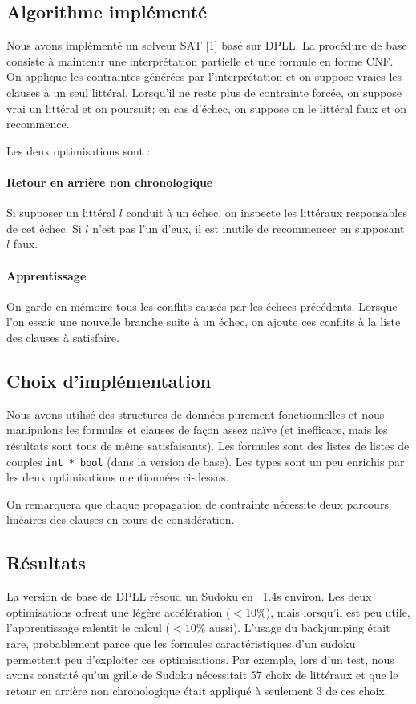 \documentclass[10pt,a4paper]{article}
\begin{document}
\subsection{Algorithme implémenté}

Nous avons implémenté un solveur SAT [1] basé sur DPLL. La procédure de base
consiste à maintenir une interprétation partielle et une formule en forme CNF.
On applique les contraintes générées par l'interprétation et on suppose vraies
les clauses à un seul littéral. Lorsqu'il ne reste plus de contrainte forcée,
on suppose vrai un littéral et on poursuit; en cas d'échec, on suppose on le
littéral faux et on recommence.

Les deux optimisations sont :

\paragraph{Retour en arrière non chronologique}

Si supposer un littéral $l$ conduit à un échec, on inspecte les littéraux
responsables de cet échec. Si $l$ n'est pas l'un d'eux, il est inutile de
recommencer en supposant $l$ faux.

\paragraph{Apprentissage}

On garde en mémoire tous les conflits causés par les échecs précédents. Lorsque
l'on essaie une nouvelle branche suite à un échec, on ajoute ces conflits à la
liste des clauses à satisfaire.

\subsection{Choix d'implémentation} Nous avons utilisé des structures de
données purement fonctionnelles et nous manipulons les formules et clauses de
façon assez naïve (et inefficace, mais les résultats sont tous de même
satisfaisants). Les formules sont des listes de listes de couples {\tt int * bool}
(dans la version de base). Les types sont un peu enrichis par les deux
optimisations mentionnées ci-dessus.

On remarquera que chaque propagation de contrainte nécessite deux parcours
linéaires des clauses en cours de considération.

\subsection{Résultats} La version de base de DPLL résoud un Sudoku en ~1.4s
environ. Les deux optimisations offrent une légère accélération ($< 10\%$),
mais lorsqu'il est peu utile, l'apprentissage ralentit le calcul ($< 10\%$
aussi). L'usage du backjumping était rare, probablement parce que les formules 
caractéristiques d'un sudoku permettent peu d'exploiter ces optimisations. Par
exemple, lors d'un test, nous avons constaté qu'un grille de Sudoku nécessitait
57 choix de littéraux et que le retour en arrière non chronologique était
appliqué à seulement 3 de ces choix.
\end{document}
